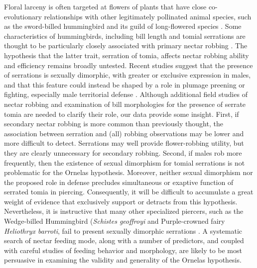 \documentclass[fleqn,10pt,lineno]{wlpeerj}
\begin{document}
%
%

Floral larceny is often targeted at flowers of plants that have close co-evolutionary relationships with other legitimately pollinated animal species, such as the sword-billed hummingbird and its guild of long-flowered species \citep{soteras2018}. 
Some characteristics of hummingbirds, including bill length and tomial serrations are thought to be particularly closely associated with primary nectar robbing \citep{ornelas1994}.
The hypothesis that the latter trait, serration of tomia, affects nectar robbing ability and efficiency remains broadly untested. 
Recent studies suggest that the presence of serrations is sexually dimorphic, with greater or exclusive expression in males, and that this feature could instead be shaped by a role in plumage preening or fighting, especially male territorial defense \citep{rico-guevara2019}. 
Although additional field studies of nectar robbing and examination of bill morphologies for the presence of serrate tomia are needed to clarify their role, our data provide some insight. %
First, if secondary nectar robbing is more common than previously thought, the association between serration and (all) robbing observations may be lower and more difficult to detect.
Serrations may well provide flower-robbing utility, but they are clearly unnecessary for secondary robbing.
Second, if males rob more frequently, then the existence of sexual dimorphism for tomial serrations is not problematic for the Ornelas hypothesis.
Moreover, neither sexual dimorphism nor the proposed role in defense precludes simultaneous or exaptive function of serrated tomia in piercing. 
Consequently, it will be difficult to accumulate a great weight of evidence that exclusively support or detracts from this hypothesis.
Nevertheless, it is instructive that many other specialized piercers, such as the Wedge-billed Hummingbird (\textit{Schistes geoffroyi} and Purple-crowned fairy \textit{Heliothryx barroti}, fail to present sexually dimorphic serrations \citep{rico-guevara2019}. 
A systematic search of nectar feeding mode, along with a number of predictors, and coupled with careful studies of feeding behavior and morphology, are likely to be most persuasive in examining the validity and generality of the Ornelas hypothesis.
\end{document}
